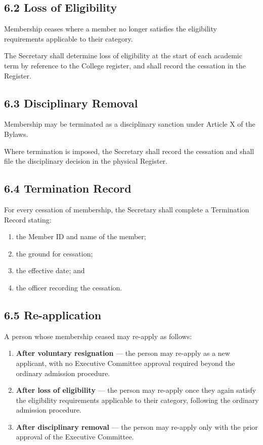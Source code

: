 \documentclass[a4paper]{article}
\begin{document}
\subsection*{6.2 Loss of Eligibility}
Membership ceases where a member no longer satisfies the eligibility
requirements applicable to their category.

The Secretary shall determine loss of eligibility at the start of each
academic term by reference to the College register, and shall record
the cessation in the Register.

\subsection*{6.3 Disciplinary Removal}
Membership may be terminated as a disciplinary sanction under Article X
of the Bylaws.

Where termination is imposed, the Secretary shall record the cessation
and shall file the disciplinary decision in the physical Register.

\subsection*{6.4 Termination Record}
For every cessation of membership, the Secretary shall complete a
Termination Record stating:
\begin{enumerate}
  \item the Member ID and name of the member;
  \item the ground for cessation;
  \item the effective date; and
  \item the officer recording the cessation.
\end{enumerate}

\subsection*{6.5 Re-application}
A person whose membership ceased may re-apply as follows:
\begin{enumerate}
  \item \textbf{After voluntary resignation} --- the person may re-apply as a new applicant, with no Executive Committee approval required beyond the ordinary admission procedure.
  \item \textbf{After loss of eligibility} --- the person may re-apply once they again satisfy the eligibility requirements applicable to their category, following the ordinary admission procedure.
  \item \textbf{After disciplinary removal} --- the person may re-apply only with the prior approval of the Executive Committee.
\end{enumerate}
\end{document}
